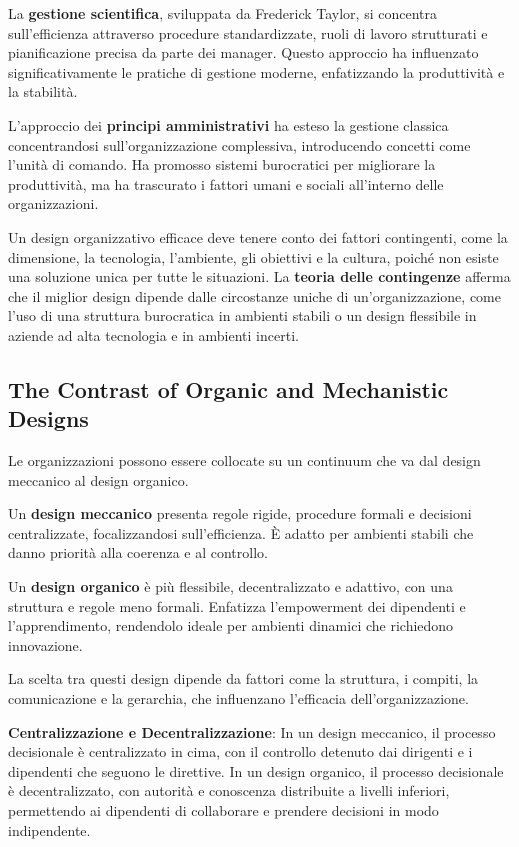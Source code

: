 \documentclass{article}
\begin{document}
La \textbf{gestione scientifica}, sviluppata da Frederick Taylor, si concentra sull'efficienza attraverso procedure standardizzate, ruoli di lavoro strutturati e pianificazione precisa da parte dei manager. Questo approccio ha influenzato significativamente le pratiche di gestione moderne, enfatizzando la produttività e la stabilità.

L'approccio dei \textbf{principi amministrativi} ha esteso la gestione classica concentrandosi sull'organizzazione complessiva, introducendo concetti come l'unità di comando. Ha promosso sistemi burocratici per migliorare la produttività, ma ha trascurato i fattori umani e sociali all'interno delle organizzazioni.

Un design organizzativo efficace deve tenere conto dei fattori contingenti, come la dimensione, la tecnologia, l'ambiente, gli obiettivi e la cultura, poiché non esiste una soluzione unica per tutte le situazioni. La \textbf{teoria delle contingenze} afferma che il miglior design dipende dalle circostanze uniche di un'organizzazione, come l'uso di una struttura burocratica in ambienti stabili o un design flessibile in aziende ad alta tecnologia e in ambienti incerti.

\subsection {The Contrast of Organic and Mechanistic Designs}
Le organizzazioni possono essere collocate su un continuum che va dal design meccanico al design organico.

Un \textbf{design meccanico} presenta regole rigide, procedure formali e decisioni centralizzate, focalizzandosi sull'efficienza. È adatto per ambienti stabili che danno priorità alla coerenza e al controllo.

Un \textbf{design organico} è più flessibile, decentralizzato e adattivo, con una struttura e regole meno formali. Enfatizza l'empowerment dei dipendenti e l'apprendimento, rendendolo ideale per ambienti dinamici che richiedono innovazione.

La scelta tra questi design dipende da fattori come la struttura, i compiti, la comunicazione e la gerarchia, che influenzano l'efficacia dell'organizzazione.

\textbf{Centralizzazione e Decentralizzazione}: In un design meccanico, il processo decisionale è centralizzato in cima, con il controllo detenuto dai dirigenti e i dipendenti che seguono le direttive. In un design organico, il processo decisionale è decentralizzato, con autorità e conoscenza distribuite a livelli inferiori, permettendo ai dipendenti di collaborare e prendere decisioni in modo indipendente.
\end{document}
